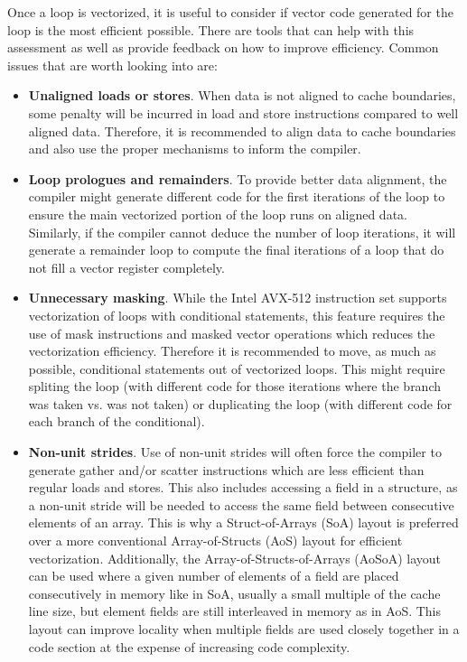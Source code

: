 \documentclass[9pt,comparison]{livecoms}
\begin{document}
Once a loop is vectorized, it is useful to consider if vector code generated for the loop is the most efficient possible. There are tools that can help with this assessment as well as provide feedback on how to improve efficiency\cite{vector-advisor}. Common issues that are worth looking into are:
\begin{itemize}
    \item \textbf{Unaligned loads or stores}. When data is not aligned to cache boundaries, some penalty will be incurred in load and store instructions compared to well aligned data. Therefore, it is recommended to align data to cache boundaries and also use the proper mechanisms to inform the compiler.
    \item \textbf{Loop prologues and remainders}. To provide better data alignment, the compiler might generate different code for the first iterations of the loop to ensure the main vectorized portion of the loop runs on aligned data. Similarly, if the compiler cannot deduce the number of loop iterations, it will generate a remainder loop to compute the final iterations of a loop that do not fill a vector register completely.   
    \item \textbf{Unnecessary masking}. While the Intel AVX-512 instruction set supports vectorization of loops with conditional statements, this feature requires the use of mask instructions and masked vector operations which reduces the vectorization efficiency. Therefore it is recommended to move, as much as possible, conditional statements out of vectorized loops. This might require spliting the loop (with different code for those iterations where the branch was taken vs. was not taken) or duplicating the loop (with different code for each branch of the conditional).
    \item \textbf{Non-unit strides}. Use of non-unit strides will often force the compiler to generate gather and/or scatter instructions which are less efficient than regular loads and stores. This also includes accessing a field in a structure, as a non-unit stride will be needed to access the same field between consecutive elements of an array. This is why a Struct-of-Arrays (SoA) layout is preferred over a more conventional Array-of-Structs (AoS) layout for efficient vectorization. Additionally, the Array-of-Structs-of-Arrays (AoSoA) layout can be used where a given number of elements of a field are placed consecutively in memory like in SoA, usually a small multiple of the cache line size, but element fields are still interleaved in memory as in AoS. This layout can improve locality when multiple fields are used closely together in a code section at the expense of increasing code complexity.

\end{itemize}
\end{document}

